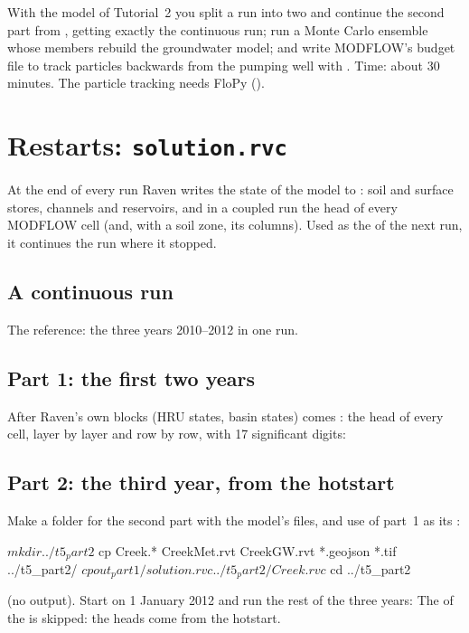 
\begin{goal}
With the model of Tutorial~2 you split a run into two and continue the second part from , getting exactly
the continuous run; run a Monte Carlo ensemble whose members rebuild the groundwater model; and write MODFLOW's budget file
to track particles backwards from the pumping well with . Time: about 30 minutes. The particle tracking
needs FloPy ().
\end{goal}


\section{Restarts: \texttt{solution.rvc}}
At the end of every run Raven writes the state of the model to : soil and surface stores, channels and
reservoirs, and in a coupled run the head of every MODFLOW cell (and, with a soil zone, its columns). Used as the
 of the next run, it continues the run where it stopped.

\subsection{A continuous run}
The reference: the three years 2010--2012 in one run.

\subsection{Part 1: the first two years}
After Raven's own blocks (HRU states, basin states) comes : the head of every cell, layer by
layer and row by row, with 17 significant digits:

\subsection{Part 2: the third year, from the hotstart}
Make a folder for the second part with the model's files, and use  of part~1 as its :
\begin{shell}
$ mkdir ../t5_part2
$ cp Creek.* CreekMet.rvt CreekGW.rvt *.geojson *.tif ../t5_part2/
$ cp out_part1/solution.rvc ../t5_part2/Creek.rvc
$ cd ../t5_part2
\end{shell}
(no output). Start on 1 January 2012 and run the rest of the three years:
The  of the  is skipped: the heads come from the hotstart.

